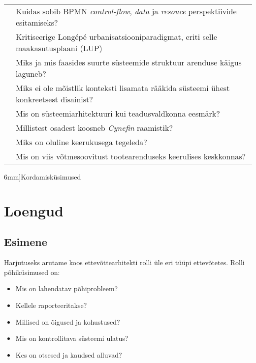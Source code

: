 \documentclass[nobib]{tufte-handout}
\begin{document}
\begin{table*}[ht]
\begin{tabular}{p{4.5cm}p{11cm}}

\cite{wohed2006suitability} & Kuidas sobib BPMN \emph{control-flow}, \emph{data} ja \emph{resouce} perspektiivide esitamiseks? \\
\cite{bertin2014urbanization} & Kritiseerige Longépé urbanisatsiooniparadigmat, eriti selle maakasutusplaani (LUP) \\

\cite{conway1968committees}  & Miks ja mis faasides suurte süsteemide struktuur arenduse käigus laguneb? \\
 & Miks ei ole mõistlik konteksti lisamata rääkida süsteemi ühest konkreetsest disainist? \\

\cite{sysengineering} & Mis on süsteemiarhitektuuri kui teadusvaldkonna eesmärk? \\

\cite{holt2017so} & Millistest osadest koosneb \emph{Cynefin} raamistik?\\
 & Miks on oluline keerukusega tegeleda? \\
 & Mis on viis võtmesoovitust tootearenduseks keerulises keskkonnas? \\
		\bottomrule
	\end{tabular}
	\caption[][6mm]{Kordamisküsimused}
	\label{tab:questions}
\end{table*}
  
  
\section{Loengud}
\subsection{Esimene}
Harjutuseks arutame koos ettevõttearhitekti rolli üle eri tüüpi ettevõtetes. Rolli põhiküsimused on:
\begin{itemize}
	\item Mis on lahendatav põhiprobleem?
	\item Kellele raporteeritakse?
	\item Millised on õigused ja kohustused?
	\item Mis on kontrollitava süsteemi ulatus?
	\item Kes on otsesed ja kaudsed alluvad?
\end{itemize}
\end{document}
